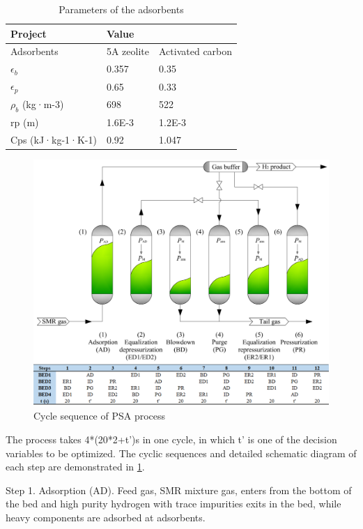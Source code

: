 \documentclass[preprint,12pt]{elsarticle}
\begin{document}
\begin{table}[]
	\centering
	\caption{Parameters of the adsorbents}
	\begin{tabular}{lll}
		\toprule
		Project           & \multicolumn{2}{l}{Value}     \\
		\midrule
		Adsorbents        & 5A zeolite & Activated carbon \\
		$\epsilon_b$                & 0.357      & 0.35             \\
		$\epsilon_p$                 & 0.65       & 0.33             \\
		$\rho_b$  (kg·m-3)       & 698        & 522              \\
		rp (m)            & 1.6E-3     & 1.2E-3           \\
		Cps (kJ·kg-1·K-1) & 0.92       & 1.047        \\
		\bottomrule   
	\end{tabular}
	\label{TABLE:2}
\end{table}

\begin{figure}
	\centering
	\includegraphics[width=1\textwidth]{figs/Fig3.pdf}
	\caption{Cycle sequence of PSA process}
	\label{FIG:3}
\end{figure}
The process takes 4*(20*2+t')s in one cycle, in which t' is one of the decision variables to be optimized. The cyclic sequences and detailed schematic diagram of each step are demonstrated in \cref{FIG:3}.

Step 1. Adsorption (AD). Feed gas, SMR mixture gas, enters from the bottom of the bed and high purity hydrogen with trace impurities exits in the bed, while heavy components are adsorbed at adsorbents.
\end{document}

